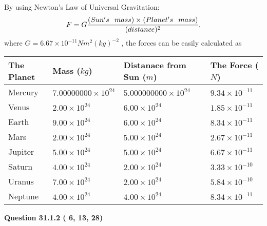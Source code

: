 \documentclass[12pt]{article}
\begin{document}
By using Newton's Law of Universal Gravitation:
\[
F=G \frac{(Sun's \hspace{0.1in} mass) \times (Planet's \hspace{0.1in} mass)} { (distance)^2},
\]
where
$ G= %
6.67 \times 10^{-11}N m^{2}(kg)^{-2}$ , the forces can be easily calculated as
 
\vspace{0.2in}
 
 
\begin{tabular}{|l|l|l|l|}
\hline
The Planet & Mass ($kg$) & Distanace from Sun ($m$) & The Force ($N$)\\
\hline
Mercury  &
           $ %
7.00000000 \times 10^{24} $   &
             $ %
5.000000000 \times 10^{24} $    & $ %
9.34 \times 10^{-11} $
\\  \hline
Venus    &
           $  %
2.00 \times 10^{24}  $     &
             $ %
6.00 \times 10^{24} $    & $ %
1.85 \times 10^{-11} $
\\  \hline
Earth    &
           $  %
9.00 \times 10^{24}  $     &
             $ %
6.00 \times 10^{24} $    & $ %
8.34 \times 10^{-11} $
\\   \hline
Mars     &
           $  %
2.00 \times 10^{24} $     &
             $ %
5.00 \times 10^{24} $    & $ %
2.67 \times 10^{-11} $
\\   \hline
Jupiter  &
           $  %
5.00 \times 10^{24} $    &
             $ %
5.00 \times 10^{24} $    & $ %
6.67 \times 10^{-11} $
\\  \hline
Saturn   &
           $  %
4.00 \times 10^{24} $    &
             $ %
2.00 \times 10^{24}  $    & $ %
3.33 \times 10^{-10} $
\\  \hline
Uranus   &
           $  %
7.00 \times 10^{24} $    &
             $ %
2.00 \times 10^{24} $    & $ %
5.84 \times 10^{-10} $
\\  \hline
Neptune  &
           $  %
4.00 \times 10^{24} $    &
             $ %
4.00 \times 10^{24} $    & $ %
8.34 \times 10^{-11} $
\\  \hline
 
\end{tabular}
 
 
 
 
  
\vspace{0.2in}
  
{\textbf{\Large{Question
31.1.2 
 (          6,         13,         28)
}}}
  
  
  
\vspace{0.2in}
  
\end{document}
